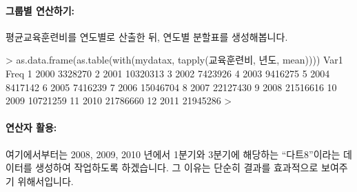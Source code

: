 \documentclass[tutorial.tex]{subfiles}
\begin{document}
\paragraph{그룹별 연산하기:}
평균교육훈련비를 연도별로 산출한 뒤, 연도별 분할표를 생성해봅니다.

\begin{Schunk}
\begin{Soutput}
> as.data.frame(as.table(with(mydatax, tapply(교육훈련비, 년도, mean))))
   Var1     Freq
1  2000  3328270
2  2001 10320313
3  2002  7423926
4  2003  9416275
5  2004  8417142
6  2005  7416239
7  2006 15046704
8  2007 22127430
9  2008 21516616
10 2009 10721259
11 2010 21786660
12 2011 21945286
> 
\end{Soutput}
\end{Schunk}

\paragraph{연산자 활용:}
여기에서부터는 2008, 2009, 2010 년에서 1분기와 3분기에 해당하는 ``다트8''이라는 데이터를 생성하여 작업하도록 하겠습니다.
그 이유는 단순히 결과를 효과적으로 보여주기 위해서입니다.
\end{document}

